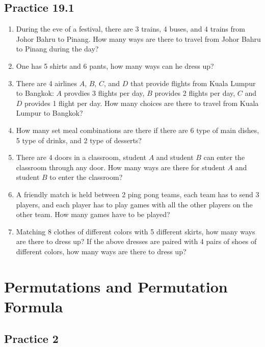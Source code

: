 \documentclass{report}
\begin{document}
\begin{multicols}{2}
  \subsection{Practice 19.1}
  \begin{enumerate}
    \item During the eve of a festival, there are 3 trains, 4 buses, and 4 trains from
          Johor Bahru to Pinang. How many ways are there to travel from Johor Bahru to
          Pinang during the day?

    \item One has 5 shirts and 6 pants, how many ways can he dress up?

    \item There are 4 airlines $A$, $B$, $C$, and $D$ that provide flights from Kuala
          Lumpur to Bangkok: $A$ provdies 3 flights per day, $B$ provides 2 flights per
          day, $C$ and $D$ provides 1 flight per day. How many choices are there to
          travel from Kuala Lumpur to Bangkok?

    \item How many set meal combinations are there if there are 6 type of main dishes, 5
          type of drinks, and 2 type of desserts?

    \item There are 4 doors in a classroom, student $A$ and student $B$ can enter the
          classroom through any door. How many ways are there for student $A$ and student
          $B$ to enter the classroom?

    \item A friendly match is held between 2 ping pong teams, each team has to send 3
          players, and each player has to play games with all the other players on the
          other team. How many games have to be played?

    \item Matching 8 clothes of different colors with 5 different skirts, how many ways
          are there to dress up? If the above dresses are paired with 4 pairs of shoes of
          different colors, how many ways are there to dress up?

  \end{enumerate}

  \section{Permutations and Permutation Formula}

  \subsection*{Practice 2}


\end{multicols}
\end{document}
